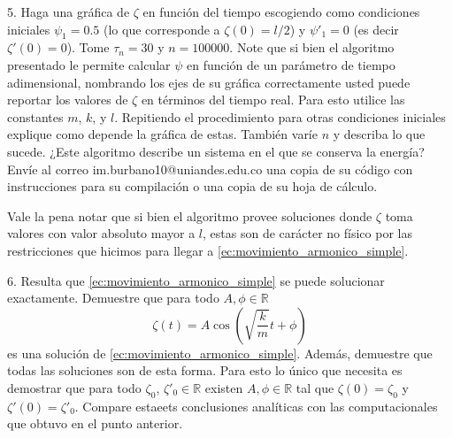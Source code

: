 \documentclass{article}
\begin{document}
5. Haga una gráfica de $\zeta$ en función del tiempo escogiendo como condiciones iniciales $\psi_1=0.5$ (lo que corresponde a $\zeta(0)=l/2$) y $\psi'_1=0$ (es decir $\zeta'(0)=0$). Tome $\tau_n=30$ y $n=100000$. Note que si bien el algoritmo presentado le permite calcular $\psi$ en función de un parámetro de tiempo adimensional, nombrando los ejes de su gráfica correctamente usted puede reportar los valores de $\zeta$ en términos del tiempo real. Para esto utilice las constantes $m$, $k$, y $l$. Repitiendo el procedimiento para otras condiciones iniciales explique como depende la gráfica de estas. También varíe $n$ y describa lo que sucede. ¿Este algoritmo describe un sistema en el que se conserva la energía? Envíe al correo im.burbano10@uniandes.edu.co una copia de su código con instrucciones para su compilación o una copia de su hoja de cálculo. 

Vale la pena notar que si bien el algoritmo provee soluciones donde $\zeta$ toma valores con valor absoluto mayor a $l$, estas son de carácter no físico por las restricciones que hicimos para llegar a \eqref{ec:movimiento_armonico_simple}.

6. Resulta que \eqref{ec:movimiento_armonico_simple} se puede solucionar exactamente. Demuestre que para todo $A,\phi\in\mathbb{R}$
\begin{equation}
\zeta(t)=A\cos(\sqrt{\frac{k}{m}}t+\phi)
\end{equation} 
es una solución de \eqref{ec:movimiento_armonico_simple}. Además, demuestre que todas las soluciones son de esta forma. Para esto lo único que necesita es demostrar que para todo $\zeta_0$, $\zeta'_0\in\mathbb{R}$ existen $A,\phi\in\mathbb{R}$ tal que $\zeta(0)=\zeta_0$ y $\zeta'(0)=\zeta'_0$. Compare estaeets conclusiones analíticas con las computacionales que obtuvo en el punto anterior.



\end{document}

